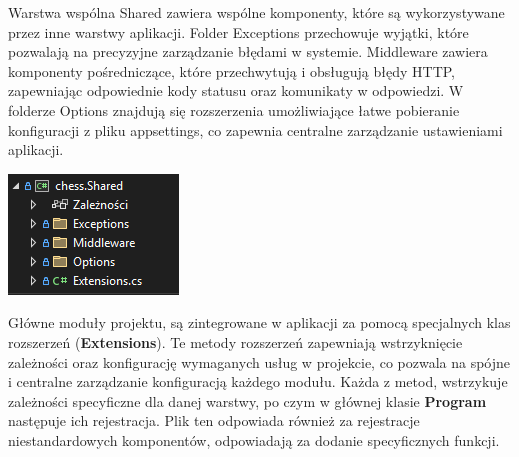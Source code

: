 \documentclass[12pt,a4paper]{article}
\begin{document}
\begin{minipage}[t]{0.45\textwidth}
    \vspace{0pt}
    \raggedright
    Warstwa wspólna Shared zawiera wspólne komponenty, które są wykorzystywane przez inne warstwy aplikacji. Folder Exceptions przechowuje wyjątki, które pozwalają na precyzyjne zarządzanie błędami w systemie. Middleware zawiera komponenty pośredniczące, które przechwytują i obsługują błędy HTTP, zapewniając odpowiednie kody statusu oraz komunikaty w odpowiedzi. W folderze Options znajdują się rozszerzenia umożliwiające łatwe pobieranie konfiguracji z pliku appsettings, co zapewnia centralne zarządzanie ustawieniami aplikacji.
\end{minipage}
\hfill
\begin{minipage}[t]{0.45\textwidth}
    \vspace{0pt}
    \centering
    \includegraphics[width=\linewidth]{images/struktura_back_shared.png} 
\end{minipage}
\vspace{0.5cm}

\noindent
Główne moduły projektu, są zintegrowane w aplikacji za pomocą specjalnych klas rozszerzeń (\textbf{Extensions}). Te metody rozszerzeń zapewniają wstrzyknięcie zależności oraz konfigurację wymaganych usług w projekcie, co pozwala na spójne i centralne zarządzanie konfiguracją każdego modułu. Każda z metod, wstrzykuje zależności specyficzne dla danej warstwy, po czym w głównej klasie \textbf{Program} następuje ich rejestracja. Plik ten odpowiada również za rejestracje niestandardowych komponentów, odpowiadają za dodanie specyficznych funkcji.
\end{document}
